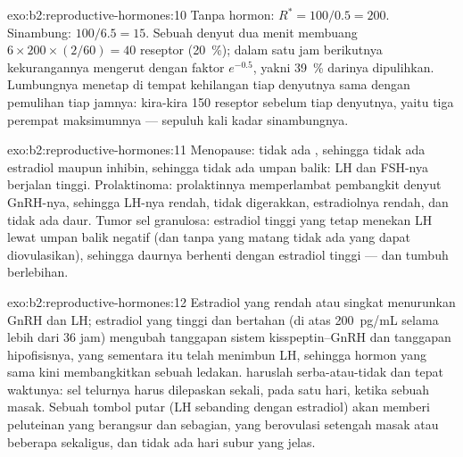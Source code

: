 \begin{solution}{exo:b2:reproductive-hormones:10}
Tanpa hormon: $R^* = 100/0.5 = 200$. Sinambung: $100/6.5 = 15$. Sebuah
denyut dua menit membuang $6\times 200\times(2/60) = 40$ reseptor
(\qty{20}{\%}); dalam satu jam berikutnya kekurangannya mengerut dengan
faktor $e^{-0.5}$, yakni \qty{39}{\%} darinya dipulihkan. Lumbungnya
menetap di tempat kehilangan tiap denyutnya sama dengan pemulihan tiap
jamnya: kira-kira 150 reseptor sebelum tiap denyutnya, yaitu tiga
perempat maksimumnya --- sepuluh kali kadar sinambungnya.
\end{solution}

\begin{solution}{exo:b2:reproductive-hormones:11}
Menopause: tidak ada , sehingga tidak ada estradiol maupun
inhibin, sehingga tidak ada umpan balik: LH dan FSH-nya berjalan
tinggi. Prolaktinoma: prolaktinnya memperlambat pembangkit denyut
GnRH-nya, sehingga LH-nya rendah,  tidak digerakkan,
estradiolnya rendah, dan tidak ada daur. Tumor sel granulosa: estradiol
tinggi yang tetap menekan LH lewat umpan balik negatif (dan tanpa
 yang matang tidak ada yang dapat diovulasikan), sehingga
daurnya berhenti dengan estradiol tinggi --- dan  tumbuh
berlebihan.
\end{solution}

\begin{solution}{exo:b2:reproductive-hormones:12}
Estradiol yang rendah atau singkat menurunkan GnRH dan LH; estradiol
yang tinggi dan bertahan (di atas \qty{200}{pg/mL} selama lebih dari 36
jam) mengubah tanggapan sistem kisspeptin--GnRH dan tanggapan
hipofisisnya, yang sementara itu telah menimbun LH, sehingga hormon
yang sama kini membangkitkan sebuah ledakan.  haruslah
serba-atau-tidak dan tepat waktunya: sel telurnya harus dilepaskan
sekali, pada satu hari, ketika sebuah  masak. Sebuah tombol
putar (LH sebanding dengan estradiol) akan memberi peluteinan yang
berangsur dan sebagian,  yang berovulasi setengah masak atau
beberapa sekaligus, dan tidak ada hari subur yang jelas.
\end{solution}

